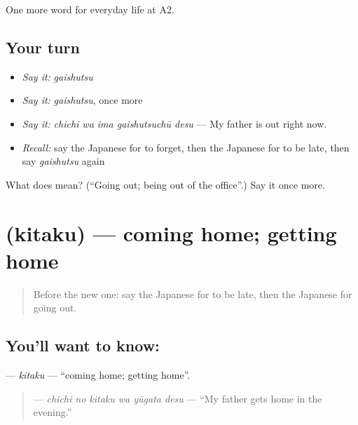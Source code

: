 \begin{grammarlens}[title={What you've built}]
One more word for everyday life at A2.
\end{grammarlens}

\subsection*{Your turn}
\begin{itemize}
\raggedright
  \item \emph{Say it:} \emph{gaishutsu}
  \item \emph{Say it:} \emph{gaishutsu}, once more
  \item \emph{Say it:} \emph{chichi wa ima gaishutsuchū desu} — My father is out right now.
  \item \emph{Recall:} say the Japanese for to forget, then the Japanese for to be late, then say \emph{gaishutsu} again
\end{itemize}

\begin{tcolorbox}[breakable,colback=teal!4,colframe=teal!35!black,title={Before you move on}]
What does  mean? (\textquotedblleft{}Going out; being out of the office\textquotedblright{}.) Say it once more.
\end{tcolorbox}
\section[\texorpdfstring{\ja{きたく} (kitaku)}{きたく (kitaku)}]{ (kitaku) — coming home; getting home}

\label{lesson:JA-C153-kitaku}



\begin{quote}
Before the new one: say the Japanese for to be late, then the Japanese for going out.
\end{quote}

\subsection*{You'll want to know: }
\textbf{} — \emph{kitaku} — \textquotedblleft{}coming home; getting home\textquotedblright{}.

\begin{quote}
\textbf{  } — \emph{chichi no kitaku wa yūgata desu} — \textquotedblleft{}My father gets home in the evening.\textquotedblright{}
\end{quote}

